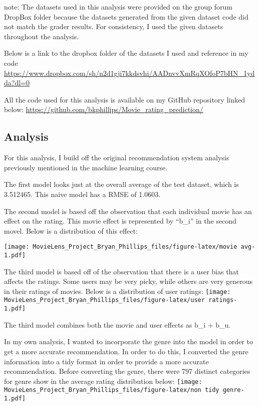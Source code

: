 \documentclass[]{article}
\begin{document}
note: The datasets used in this analysis were provided on the group
forum DropBox folder because the datasets generated from the given
dataset code did not match the grader results. For consistency, I used
the given datasets throughout the analysis.

Below is a link to the dropbox folder of the datasets I used and
reference in my code
\url{https://www.dropbox.com/sh/n2d1gji7kkdsvhi/AADnvvXmRqXOfoP7bHN_1ydda?dl=0}

All the code used for this analysis is available on my GitHub repository
linked below:
\url{https://github.com/bkphillips/Movie_rating_prediction/}

\subsection{Analysis}\label{analysis}

For this analysis, I build off the original recommendation system
analysis previously mentioned in the machine learning course.

The first model looks just at the overall average of the test dataset,
which is 3.512465. This naive model has a RMSE of 1.0603.

The second model is based off the observation that each individual movie
has an effect on the rating. This movie effect is represented by
``b\_i'' in the second movel. Below is a distribution of this effect:

\texttt{[image: MovieLens\_Project\_Bryan\_Phillips\_files/figure-latex/movie avg-1.pdf]}

The third model is based off of the observation that there is a user
bias that affects the ratings. Some users may be very picky, while
others are very generous in their ratings of movies. Below is a
distribution of user ratings:
\texttt{[image: MovieLens\_Project\_Bryan\_Phillips\_files/figure-latex/user ratings-1.pdf]}

The third model combines both the movie and user effects as b\_i + b\_u.

In my own analysis, I wanted to incorporate the genre into the model in
order to get a more accurate recommendation. In order to do this, I
converted the genre information into a tidy format in order to provide a
more accurate recommendation. Before converting the genre, there were
797 distinct categories for genre show in the average rating
distribution below:
\texttt{[image: MovieLens\_Project\_Bryan\_Phillips\_files/figure-latex/non tidy genre-1.pdf]}
\end{document}
